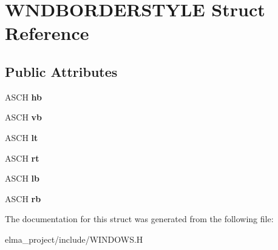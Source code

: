 \hypertarget{struct_w_n_d_b_o_r_d_e_r_s_t_y_l_e}{}\section{W\+N\+D\+B\+O\+R\+D\+E\+R\+S\+T\+Y\+LE Struct Reference}
\label{struct_w_n_d_b_o_r_d_e_r_s_t_y_l_e}
\subsection*{Public Attributes}
\begin{DoxyCompactItemize}
\item 
\mbox{\label{struct_w_n_d_b_o_r_d_e_r_s_t_y_l_e_ae654e1377163de0bc7e0957ad6c165d3}} 
A\+S\+CH {\bfseries hb}
\item 
\mbox{\label{struct_w_n_d_b_o_r_d_e_r_s_t_y_l_e_a3a84a6b398508e91c41e48bad4c2641d}} 
A\+S\+CH {\bfseries vb}
\item 
\mbox{\label{struct_w_n_d_b_o_r_d_e_r_s_t_y_l_e_a2d81868b6ae4bc48742d183a64221f5c}} 
A\+S\+CH {\bfseries lt}
\item 
\mbox{\label{struct_w_n_d_b_o_r_d_e_r_s_t_y_l_e_a56871e951ba8d1a3ab00c4a9b3293b6a}} 
A\+S\+CH {\bfseries rt}
\item 
\mbox{\label{struct_w_n_d_b_o_r_d_e_r_s_t_y_l_e_a8b8e8e8331b439ca2b02a271f031d7f3}} 
A\+S\+CH {\bfseries lb}
\item 
\mbox{\label{struct_w_n_d_b_o_r_d_e_r_s_t_y_l_e_a2efdcb81973f637aff36cec833c28324}} 
A\+S\+CH {\bfseries rb}
\end{DoxyCompactItemize}


The documentation for this struct was generated from the following file\+:\begin{DoxyCompactItemize}
\item 
elma\+\_\+project/include/W\+I\+N\+D\+O\+W\+S.\+H\end{DoxyCompactItemize}
